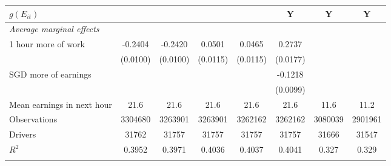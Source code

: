 \documentclass[reviewmode,AEJ]{AEA}
\begin{document}
\begin{table}[]
{\begin{tabularx}{\textwidth}{l@{\extracolsep{\fill}}*{7}{S[table-format = 0.4, table-space-text-pre={**}, table-space-text-post={-**}]}}
			\(g(E_{it})\)&         {}         &         {}         &         {}         &         {}         &         {Y}         &  {Y} &   {Y}\\
			\midrule
			\textit{Average marginal effects} & & & & & & & \\
			1 hour more of work&     -0.2404\sym{***}         &     -0.2420\sym{***}         &      0.0501\sym{***}         &      0.0465\sym{***}         &      0.2737\sym{***}         & & \\
			&    (0.0100)         &    (0.0100)         &    (0.0115)         &    (0.0115)         &    (0.0177)         & & \\
			 SGD more of earnings&                     &                     &                     &                     &     -0.1218\sym{***}         & & \\
			&                     &                     &                     &                     &    (0.0099)         & & \\
			\midrule
			Mean earnings in next hour&     \num{21.6}         &     \num{21.6}         &     \num{21.6}         &     \num{21.6}         &     \num{21.6}         & \num{11.6} & \num{11.2}\\
			Observations&\num{3304680}         &\num{3263901}         &\num{3263901}         &\num{3262162}         &\num{3262162}         & \num{3080039}& \num{2901961}\\
			Drivers     & \num{31762}         & \num{31757}         & \num{31757}         & \num{31757}         & \num{31757}         & \num{31666} & \num{31547}\\
			\(R^2\)     &      0.3952         &      0.3971         &      0.4036         &      0.4037         &      0.4041         & 0.327 & 0.329\\
			\bottomrule& & 
		\end{tabularx}
	}
	\begin{tablenotes}
		\small

\end{tablenotes}
\end{table}
\end{document}
